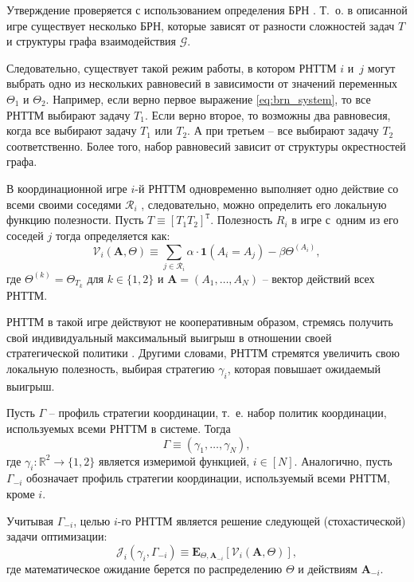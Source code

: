 Утверждение проверяется с использованием определения БРН \cite{GlobalGames3}. Т.\ о. в описанной игре существует несколько БРН, которые зависят от разности сложностей задач $T$ и структуры графа взаимодействия $\mathcal{G}$.

Следовательно, существует такой режим работы, в котором РНТТМ $i$ и~$j$ могут выбрать одно из нескольких равновесий в зависимости от значений переменных $\Theta_1$ и $\Theta_2$. Например, если верно первое выражение \eqref{eq:brn_system}, то все РНТТМ выбирают задачу $T_1$. Если верно второе, то возможны два равновесия, когда все выбирают задачу $T_1$ или $T_2$. А при третьем -- все выбирают задачу $T_2$ соответственно. Более того, набор равновесий зависит от структуры окрестностей графа.

В координационной игре $i$-й РНТТМ одновременно выполняет одно действие со всеми своими соседями $\mathcal{R}_i$ \cite{GlobalGames4}, следовательно, можно определить его локальную функцию полезности. Пусть $T \equiv [T_1T_2]^{\mathtt{T}}$. Полезность $R_i$ в игре с~одним из его соседей $j$ тогда определяется как:
\begin{equation}
	\label{eq:local_usefulness_ntts}
	\mathcal{V}_i(\mathbf{A}, \Theta) \equiv
	\displaystyle\sum_{j \in \mathcal{R}_i} \alpha \cdot \mathbf{1}(A_i = A_j) - \beta \Theta^{(A_i)},
\end{equation}
где $\Theta^{(k)} = \Theta_{T_k} \text{ для } k \in \{1,2\}$ и $\mathbf{A} = (A_1,\dots,A_N)$ -- вектор действий всех РНТТМ.

РНТТМ в такой игре действуют не кооперативным образом, стремясь получить свой индивидуальный максимальный выигрыш в отношении своей стратегической политики \cite{GlobalGames3}. Другими словами, РНТТМ стремятся увеличить свою локальную полезность, выбирая стратегию $\gamma_i$, которая повышает ожидаемый выигрыш.

Пусть $\Gamma$ -- профиль стратегии координации, т.\ е. набор политик координации, используемых всеми РНТТМ в системе. Тогда
\begin{equation}
	\label{eq:strategy_ntts}
	\Gamma \equiv (\gamma_1, \dots, \gamma_N),
\end{equation}
где $\gamma_i: \mathbb{R}^2 \rightarrow \{1,2\}$ является измеримой функцией, $i \in [N]$. Аналогично, пусть $\Gamma_{-i}$ обозначает профиль стратегии координации, используемый всеми РНТТМ, кроме $i$.

Учитывая $\Gamma_{-i}$, целью $i$-го РНТТМ является решение следующей (стохастической) задачи оптимизации:
\begin{equation}
	\label{eq:optima_ntts}
	\mathcal{J}_i(\gamma_i, \Gamma_{-i}) \equiv \mathbf{E}_{\Theta, \mathbf{A}_{-i}}\left[\mathcal{V}_i(\mathbf{A}, \Theta)\right],
\end{equation}
где математическое ожидание берется по распределению $\Theta$ и действиям $\mathbf{A}_{-i}$.

